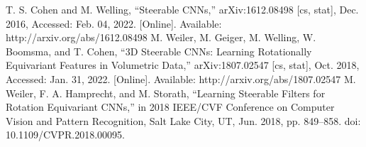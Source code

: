 \documentclass{article}
\begin{document}
\begin{thebibliography}{9}
    T. S. Cohen and M. Welling, “Steerable CNNs,” arXiv:1612.08498 [cs, stat], Dec. 2016, Accessed: Feb. 04, 2022. [Online]. Available: http://arxiv.org/abs/1612.08498
    M. Weiler, M. Geiger, M. Welling, W. Boomsma, and T. Cohen, “3D Steerable CNNs: Learning Rotationally Equivariant Features in Volumetric Data,” arXiv:1807.02547 [cs, stat], Oct. 2018, Accessed: Jan. 31, 2022. [Online]. Available: http://arxiv.org/abs/1807.02547
    M. Weiler, F. A. Hamprecht, and M. Storath, “Learning Steerable Filters for Rotation Equivariant CNNs,” in 2018 IEEE/CVF Conference on Computer Vision and Pattern Recognition, Salt Lake City, UT, Jun. 2018, pp. 849–858. doi: 10.1109/CVPR.2018.00095.
\end{thebibliography}
\end{document}
